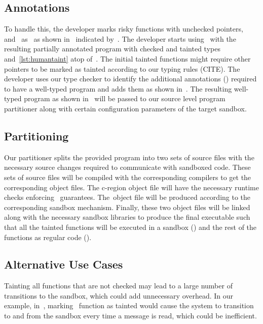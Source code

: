 \subsection{\systemname Annotations}
\label{subsec:moveregionstosbx}
To handle this, the developer marks risky functions with unchecked pointers,~\ie~ and~ as~ as shown in~ indicated by~\useradded.
The developer starts using~\systemname{} with the resulting partially annotated program with checked and tainted types~\ie~ and~\ref{lst:humantaint} atop of~.
The initial tainted functions might require other pointers to be marked as tainted according to our typing rules (CITE).
The developer uses our type checker to identify the additional annotations (\usermods) required to have a well-typed program and adds them as shown in~.
The resulting well-typed program as shown in~ will be passed to our source level program partitioner along with certain configuration parameters of the target sandbox.

\subsection{Partitioning}
Our partitioner splits the provided program into two sets of source files with the necessary source changes required to communicate with sandboxed code.
These sets of source files will be compiled with the corresponding compilers to get the corresponding object files.
The c-region object file will have the necessary runtime checks enforcing~\systemname{} guarantees.
The~\ucregion object file will be produced according to the corresponding sandbox mechanism.
Finally, these two object files will be linked along with the necessary sandbox libraries to produce the final executable such that all the tainted functions will be executed in a sandbox (\ucregion) and the rest of the functions as regular code (\cregion).

\subsection{Alternative Use Cases}


Tainting all functions that are not checked may lead to a large number of transitions to the sandbox, which could add unnecessary overhead. In our example, in~, marking~ function as tainted would cause the system to transition to and from the sandbox every time a message is read, which could be inefficient. 

